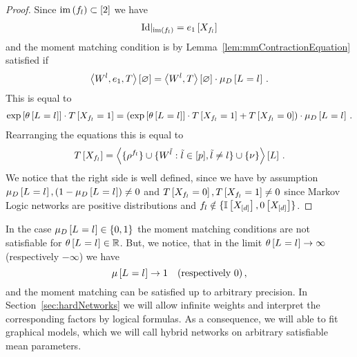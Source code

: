 \begin{proof}
	Since $\mathrm{im}\left(f_{l}\right)\subset[2]$ we have
	\begin{align*}
		{\mathrm{Id}}|_{\mathrm{im}\left(f_{l}\right)} = e_{1}\left[X_{f_{l}}\right]
	\end{align*}
	and the moment matching condition is by Lemma~\ref{lem:mmContractionEquation} satisfied if
	\begin{align*}
		\left\langle W^{l}, e_{1}, T\right\rangle \left[ \varnothing \right]
			= \left\langle W^{l},T\right\rangle \left[ \varnothing \right] \cdot \mu_{D}\left[L_{}=l_{}\right] \, . 
	\end{align*}
	This is equal to 
	\begin{align*}
		\mathrm{exp}\left[\theta\left[L_{}=l_{}\right]\right] \cdot T\left[X_{f_{l}}=1\right]
		= \left( \mathrm{exp}\left[\theta\left[L_{}=l_{}\right]\right] \cdot T\left[X_{f_{l}}=1\right] + T\left[X_{f_{l}}=0\right] \right) \cdot \mu_{D}\left[L_{}=l_{}\right] \, . 
	\end{align*}
	Rearranging the equations this is equal to 
	\begin{align*}
	 	T\left[X_{f_{l}}\right] 
		= \left\langle \{\rho^{f_{l}}\}
		\cup\{W^{\tilde{l}} : \tilde{l} \in [p], \tilde{l}\neq l\}
		\cup\{\nu\}\right\rangle \left[ L \right] \, . 
	\end{align*}
	We notice that the right side is well defined, since we have by assumption $\mu_{D}\left[L_{}=l_{}\right], (1- \mu_{D}\left[L_{}=l_{}\right]) \neq 0$ and $T\left[X_{f_{l}}=0\right], T\left[X_{f_{l}}=1\right] \neq 0$ since Markov Logic networks are positive distributions and $f_{l} \notin \{\mathbb{I}\left[X_{[d]}\right],0\left[X_{[d]}\right]\}$.
\end{proof}


In the case $\mu_{D}\left[L_{}=l_{}\right]\in\{0,1\}$ the moment matching conditions are not satisfiable for $\theta\left[L_{}=l_{}\right]\in\mathbb{R}$.
But, we notice, that in the limit $\theta\left[L_{}=l_{}\right]\rightarrow \infty $ (respectively $-\infty$) we have
	\[ \mu\left[L_{}=l_{}\right] \rightarrow  1 \quad \text{(respectively $0$)}\, ,  \]
and the moment matching can be satisfied up to arbitrary precision.
In Section~\ref{sec:hardNetworks} we will allow infinite weights and interpret the corresponding factors by logical formulas.
As a consequence, we will able to fit graphical models, which we will call hybrid networks on arbitrary satisfiable mean parameters.

